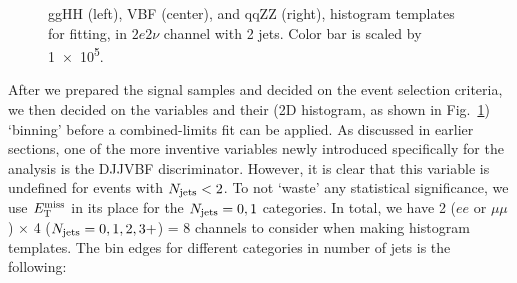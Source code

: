 \begin{figure}[htb]
\begin{center}
\end{center}
\caption{ggHH (left), VBF (center), and qqZZ (right), histogram templates for fitting,
in $2e2\nu$ channel with 2 jets. Color bar is scaled by \num{1e5}.}
\label{fig:templates_demo}
\end{figure}
After we prepared the signal samples and decided on the event selection criteria, we then
decided on the variables and their (2D histogram, as shown in Fig.~\ref{fig:templates_demo}) `binning' before a combined-limits
fit can be applied. As discussed in earlier sections, one of the more inventive variables
newly introduced specifically for the analysis is the DJJVBF discriminator. However, it is
clear that this variable is undefined for events with $N_\mathrm{jets} < 2$. To
not `waste' any statistical significance, we use $E_{\mathrm{T}}^{\mathrm{miss}}$ in its place for the
$N_\mathrm{jets} = 0,1$ categories. In total, we have 2 ($ee$ or $\mu\mu$) $\times$ 4 ($N_\mathrm{jets} = 0,1,2,3+$) = 8
channels to consider when making histogram templates.
The bin edges for different categories in number of jets is the following:
